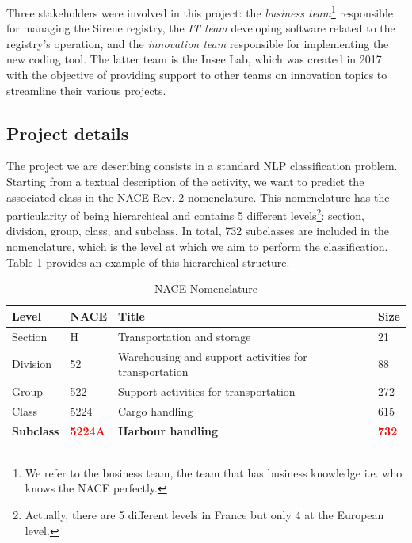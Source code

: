 Three stakeholders were involved in this project: the \textit{business team}\footnote{We refer to the business team, the team that has business knowledge i.e. who knows the NACE perfectly.} responsible for managing the Sirene registry, the \textit{IT team} developing software related to the registry's operation, and the \textit{innovation team} responsible for implementing the new coding tool. The latter team is the Insee Lab, which was created in 2017 with the objective of providing support to other teams on innovation topics to streamline their various projects.

\subsection{Project details}

The project we are describing consists in a standard NLP classification problem. Starting from a textual description of the activity, we want to predict the associated class in the NACE Rev. 2 nomenclature. This nomenclature has the particularity of being hierarchical and contains 5 different levels\footnote{Actually, there are 5 different levels in France but only 4 at the European level.}: section, division, group, class, and subclass. In total, 732 subclasses are included in the nomenclature, which is the level at which we aim to perform the classification. Table \ref{tab:nace-nomenclature} provides an example of this hierarchical structure.

\begin{table}[htbp]
    \centering
    \begin{tabular}{llll}
    \textbf{Level} & \textbf{NACE} & \textbf{Title} & \textbf{Size} \\ \hline
    Section & H & Transportation and storage & 21 \\ \hline
    Division & 52 & Warehousing and support activities for transportation & 88 \\ \hline
    Group & 522 & Support activities for transportation & 272 \\ \hline
    Class & 5224 & Cargo handling & 615 \\ \hline
    \textbf{Subclass} & \textbf{\textcolor{red}{5224A}} & \textbf{Harbour handling} & \textbf{\textcolor{red}{732}} \\ 
    \end{tabular}
    \caption{NACE Nomenclature}
    \label{tab:nace-nomenclature}
    \end{table}


